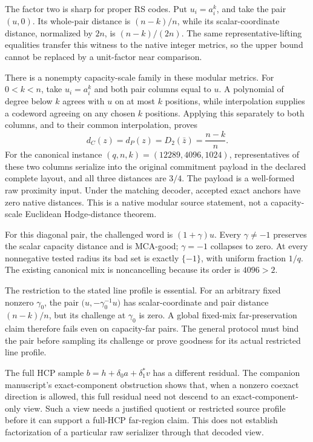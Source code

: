 The factor two is sharp for proper RS codes. Put \(u_i=a_i^k\), and take
the pair \((u,0)\). Its whole-pair distance is \((n-k)/n\), while its
scalar-coordinate distance, normalized by \(2n\), is \((n-k)/(2n)\).
The same representative-lifting equalities transfer this witness to the
native integer metrics, so the upper bound cannot be replaced by a
unit-factor near comparison.

There is a nonempty capacity-scale family in these modular metrics. For
\(0<k<n\), take \(u_i=a_i^k\) and both pair columns equal to \(u\).
A polynomial of degree below \(k\) agrees with \(u\) on at most \(k\)
positions, while interpolation supplies a codeword agreeing on any chosen
\(k\) positions. Applying this separately to both columns, and to their
common interpolation, proves
\[
 d_C(z)=d_P(z)=D_2(\bar z)=\frac{n-k}{n}.
\]
For the canonical instance \((q,n,k)=(12289,4096,1024)\), representatives
of these two columns serialize into the original commitment payload in the
declared complete layout, and all three distances are \(3/4\).
The payload is a well-formed raw proximity input. Under the matching decoder,
accepted exact anchors have zero native distances. This is a native modular source
statement, not a capacity-scale Euclidean Hodge-distance theorem.

For this diagonal pair, the challenged word is \((1+\gamma)u\). Every
\(\gamma\ne-1\) preserves the scalar capacity distance and is MCA-good;
\(\gamma=-1\) collapses to zero. At every nonnegative tested radius its bad
set is exactly \(\{-1\}\), with uniform fraction \(1/q\). The existing
canonical mix is noncancelling because its order is \(4096>2\).

The restriction to the stated line profile is essential. For an arbitrary
fixed nonzero \(\gamma_0\), the pair
\(\bigl(u,-\gamma_0^{-1}u\bigr)\) has scalar-coordinate and pair distance
\((n-k)/n\), but its challenge at \(\gamma_0\) is zero. A global fixed-mix
far-preservation claim therefore fails even on capacity-far pairs. The
general protocol must bind the pair before sampling its challenge or prove
goodness for its actual restricted line profile.

The full HCP sample \(b=h+\delta_0a+\delta_1^*v\) has a different
residual. The companion manuscript's exact-component obstruction
\cite{vanDerVlugt2026hcp} shows that, when a nonzero coexact direction is
allowed, this full residual need not descend to an exact-component-only
view. Such a view needs a justified quotient or restricted source profile
before it can support a full-HCP far-region claim. This does not establish
factorization of a particular raw serializer through that decoded view.

